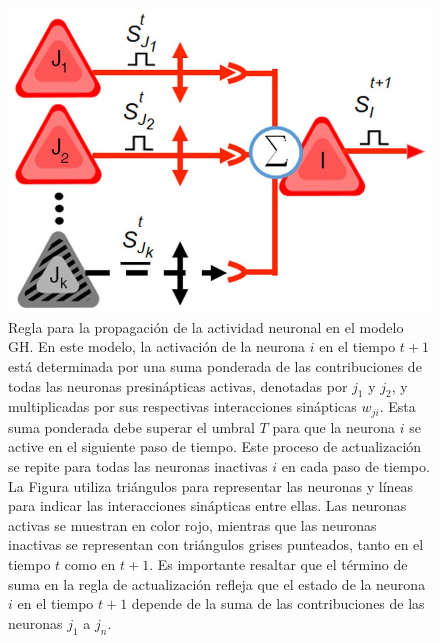 \begin{figure}[ht]
	\centering\includegraphics[width=\imsize]{reglaautomata}
	\caption[Regla para la propagación de la actividad neuronal en el modelo GH.]{Regla para la propagación de la actividad neuronal en el modelo GH. En este modelo, la activación de la neurona $i$ en el tiempo $t + 1$ está determinada por una suma ponderada de las contribuciones de todas las neuronas presinápticas activas, denotadas por $j_1$ y $j_2$, y multiplicadas por sus respectivas interacciones sinápticas $w_{ji}$. Esta suma ponderada debe superar el umbral $T$ para que la neurona $i$ se active en el siguiente paso de tiempo. Este proceso de actualización se repite para todas las neuronas inactivas $i$ en cada paso de tiempo. La Figura utiliza triángulos para representar las neuronas y líneas para indicar las interacciones sinápticas entre ellas. Las neuronas activas se muestran en color rojo, mientras que las neuronas inactivas se representan con triángulos grises punteados, tanto en el tiempo $t$ como en $t + 1$. Es importante resaltar que el término de suma en la regla de actualización refleja que el estado de la neurona $i$ en el tiempo $t + 1$ depende de la suma de las contribuciones de las neuronas $j_1$ a $j_n$.} 	\label{fig:reglaautomata}
\end{figure}



